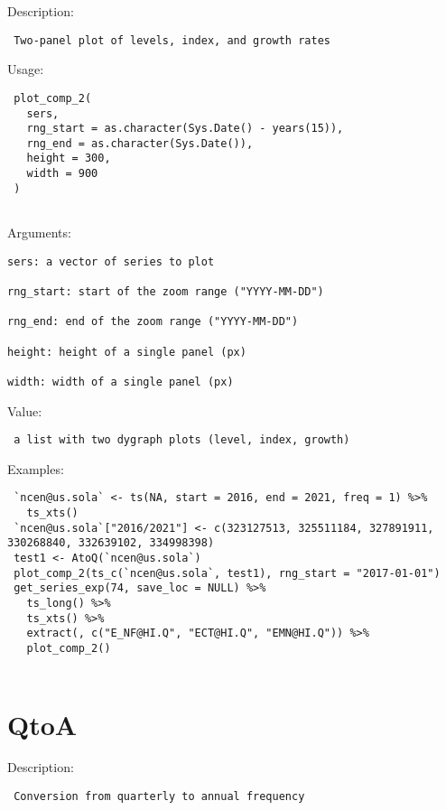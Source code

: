 \documentclass[
  letterpaper,
  DIV=11,
  numbers=noendperiod]{scrreport}
\begin{document}
Description:

\begin{verbatim}
 Two-panel plot of levels, index, and growth rates
\end{verbatim}

Usage:

\begin{verbatim}
 plot_comp_2(
   sers,
   rng_start = as.character(Sys.Date() - years(15)),
   rng_end = as.character(Sys.Date()),
   height = 300,
   width = 900
 )
 
\end{verbatim}

Arguments:

\begin{verbatim}
sers: a vector of series to plot

rng_start: start of the zoom range ("YYYY-MM-DD")

rng_end: end of the zoom range ("YYYY-MM-DD")

height: height of a single panel (px)

width: width of a single panel (px)
\end{verbatim}

Value:

\begin{verbatim}
 a list with two dygraph plots (level, index, growth)
\end{verbatim}

Examples:

\begin{verbatim}
 `ncen@us.sola` <- ts(NA, start = 2016, end = 2021, freq = 1) %>% 
   ts_xts()
 `ncen@us.sola`["2016/2021"] <- c(323127513, 325511184, 327891911, 330268840, 332639102, 334998398)
 test1 <- AtoQ(`ncen@us.sola`)
 plot_comp_2(ts_c(`ncen@us.sola`, test1), rng_start = "2017-01-01")
 get_series_exp(74, save_loc = NULL) %>%
   ts_long() %>%
   ts_xts() %>%
   extract(, c("E_NF@HI.Q", "ECT@HI.Q", "EMN@HI.Q")) %>%
   plot_comp_2()
 
\end{verbatim}

\section{QtoA}\label{qtoa}

Description:

\begin{verbatim}
 Conversion from quarterly to annual frequency
\end{verbatim}
\end{document}
